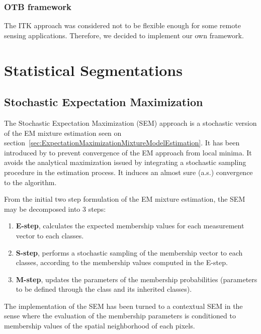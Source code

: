 \ifitkFullVersion

\fi 

\subsubsection{OTB framework}
\label{sec:MarkovRandomFieldOTB}
The ITK approach was considered not to be flexible enough for some
remote sensing applications. Therefore, we decided to implement our
own framework.

\ifitkFullVersion

\fi 



\section{Statistical Segmentations}
\label{sec:StatisticalSegmentations}


\subsection{Stochastic Expectation Maximization}
\label{sec:SEM}

The Stochastic Expectation Maximization (SEM) approach is a stochastic 
version of the EM mixture estimation seen on
section~\ref{sec:ExpectationMaximizationMixtureModelEstimation}. It has been 
introduced by \cite{CeDi95} to prevent convergence of the EM approach from
local minima. It avoids the analytical maximization issued by integrating a
stochastic sampling procedure in the estimation process. It induces an almost
sure (a.s.) convergence to the algorithm.

From the initial two step formulation of the EM mixture estimation, the SEM
may be decomposed into 3 steps:
\begin{enumerate}
\item \textbf{E-step}, calculates the expected membership values for each 
measurement vector to each classes.
\item \textbf{S-step}, performs a stochastic sampling of the membership vector
to each classes, according to the membership values computed in the E-step.
\item \textbf{M-step}, updates the parameters of the membership probabilities
(parameters to be defined through the class
 and its inherited classes).
\end{enumerate}
The implementation of the SEM has been turned to a contextual SEM in the sense
where the evaluation of the membership parameters is conditioned to
membership values of the spatial neighborhood of each pixels.

